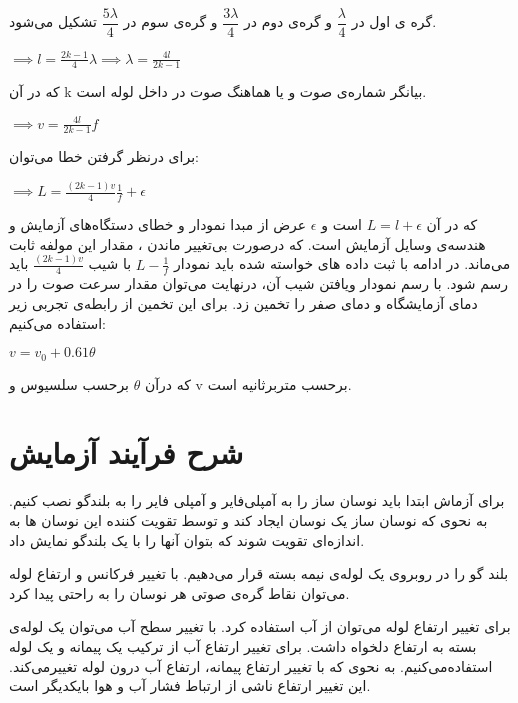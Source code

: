 \documentclass{article}
\begin{document}
گره ی اول در  $\dfrac{\lambda}{4}$ و گره‌ی دوم در  $\dfrac{3\lambda}{4}$ و گره‌ی سوم در  $\dfrac{5\lambda}{4}$ تشکیل می‌شود.

\begin{center}
$
\implies l = \frac{2k-1}{4}\lambda \implies \lambda = \frac{4l}{2k-1}
$
\end{center}

که در آن k بیانگر شماره‌ی صوت و یا هماهنگ صوت در داخل لوله است.


\begin{center}
$
\implies v = \frac{4l}{2k-1}f
$
\end{center}

برای درنظر گرفتن خطا می‌توان:

\begin{center}
$\implies L = \frac{(2k-1)v}{4}\frac{1}{f}+\epsilon$
\end{center}

که در آن $L = l + \epsilon$ است و $\epsilon$ عرض از مبدا نمودار و خطای دستگاه‌های آزمایش و هندسه‌ی وسایل آزمایش است. که درصورت بی‌تغییر ماندن ، مقدار این مولفه ثابت می‌ماند.
در ادامه با ثبت داده های خواسته شده باید نمودار $L - \frac{1}{f}$ با شیب $\frac{(2k-1)v}{4}$ باید رسم شود.
با رسم نمودار ویافتن شیب آن، درنهایت می‌توان مقدار سرعت صوت را در دمای آزمایشگاه و دمای صفر را تخمین زد.
برای این تخمین از رابطه‌ی تجربی زیر استفاده می‌کنیم:

\begin{centering}
$v = v_0 + 0.61\theta$
\end{centering}


که درآن $\theta$ برحسب سلسیوس و v برحسب متربرثانیه است.

\section{شرح فرآیند آزمایش}

برای آزماش ابتدا باید نوسان ساز را به آمپلی‌فایر و آمپلی فایر را به بلندگو نصب کنیم. به نحوی که نوسان ساز یک نوسان ایجاد کند و توسط تقویت کننده این نوسان ها به اندازه‌ای تقویت شوند که بتوان آنها را با یک بلندگو نمایش داد. 

بلند گو را در روبروی یک لوله‌ی نیمه بسته قرار می‌دهیم. با تغییر فرکانس و ارتفاع لوله می‌توان نقاط گره‌ی صوتی هر نوسان را به راحتی پیدا کرد. 

برای تغییر ارتفاع لوله می‌توان از آب استفاده کرد. با تغییر سطح آب می‌توان یک لوله‌ی بسته به ارتفاع دلخواه داشت. برای تغییر ارتفاع آب از ترکیب یک پیمانه و یک لوله استفاده‌می‌کنیم. به نحوی که با تغییر ارتفاع پیمانه، ارتفاع آب درون لوله تغییرمی‌کند.
این تغییر ارتفاع ناشی از ارتباط فشار آب و هوا بایکدیگر است.
\end{document}

